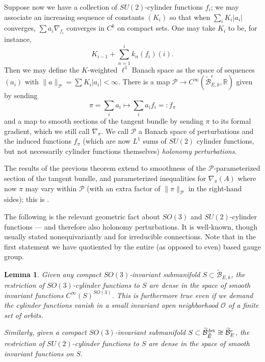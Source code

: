 \documentclass{memo-l}
\newtheorem{lemma}[theorem]{Lemma}
\theoremstyle{definition}
\theoremstyle{remark}
\numberwithin{section}{chapter}
\numberwithin{equation}{chapter}
\begin{document}
Suppose now we have a collection of $SU(2)$-cylinder functions $f_i$; we may associate an increasing sequence of constants $(K_i)$ so that when $\sum_i K_i |a_i|$ converges, $\sum a_i \nabla_{f_i}$ converges in $C^k$ on compact sets. One may take $K_i$ to be, for instance, 
$$K_{i-1} + \sum_{n=1}^i k_n(f_i)(i).$$ Then we may define the $K$-weighted $\ell^1$ Banach space as the space of sequences $(a_i)$ with $\|a\|_{\mathcal P} = \sum K_i |a_i| < \infty$. There is a map $\mathcal P \to C^\infty(\widetilde{\mathcal B}^e_{E,k}, \mathbb R)$ given by sending 
$$\pi = \sum_i a_i \mapsto \sum_i a_i f_i =: f_\pi$$ 
and a map to smooth sections of the tangent bundle by sending $\pi$ to its formal gradient, which we still call $\nabla_\pi$. We call $\mathcal P$ a Banach space of perturbations and the induced functions $f_\pi$ (which are now $L^1$ sums of $SU(2)$ cylinder functions, but not necessarily cylinder functions themselves) \textit{holonomy perturbations}. 

The results of the previous theorem extend to smoothness of the $\mathcal P$-parameterized section of the tangent bundle, and parameterized inequalities for $\nabla_\pi(A)$ where now $\pi$ may vary within $\mathcal P$ (with an extra factor of $\|\pi\|_{\mathcal P}$ in the right-hand sides); this is \cite[Proposition~3.7]{KM1}. 

The following is the relevant geometric fact about $SO(3)$ and $SU(2)$-cylinder functions --- and therefore also holonomy perturbations. It is well-known, though usually stated nonequivariantly and for irreducible connections. Note that in the first statement we have quotiented by the entire (as opposed to even) based gauge group.

\begin{lemma}\label{dense}Given any compact $SO(3)$-invariant submanifold $S \subset \widetilde{\mathcal B}_{E,k}$, the restriction of $SO(3)$-cylinder functions to $S$ are dense in the space of smooth invariant functions $C^\infty(S)^{SO(3)}$. This is furthermore true even if we demand the cylinder functions vanish in a small invariant open neighborhood $\mathcal O$ of a finite set of orbits.

Similarly, given a compact $SO(3)$-invariant submanifold $S \subset \widetilde{\mathcal B}^{\textup{det}}_{\tilde E} \cong \widetilde{\mathcal B}^e_E$, the restriction of $SU(2)$-cylinder functions to $S$ are dense in the space of smooth invariant functions on $S$.
\end{lemma}
\end{document}
